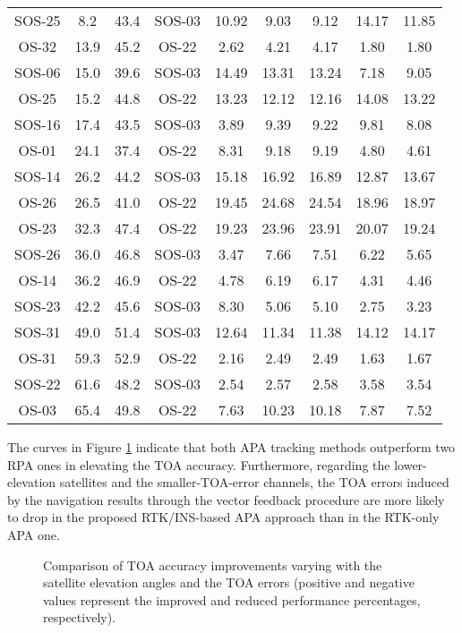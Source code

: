 \documentclass{article}
\newcommand{\reffig}[1]{Figure \ref{#1}}
\begin{document}
\begin{table}[htbp]
\begin{tabular}{ccccccccc}
	SOS-25 & 8.2 & 43.4 & SOS-03 & 10.92 & 9.03 & 9.12 & 14.17 & 11.85 \\  
	OS-32 & 13.9 & 45.2 & OS-22 & 2.62 & 4.21 & 4.17 & 1.80 & 1.80 \\  
	SOS-06 & 15.0 & 39.6 & SOS-03 & 14.49 & 13.31 & 13.24 & 7.18 & 9.05 \\  
	OS-25 & 15.2 & 44.8 & OS-22 & 13.23 & 12.12 & 12.16 & 14.08 & 13.22 \\  
	SOS-16 & 17.4 & 43.5 & SOS-03 & 3.89 & 9.39 & 9.22 & 9.81 & 8.08 \\  
	OS-01 & 24.1 & 37.4 & OS-22 & 8.31 & 9.18 & 9.19 & 4.80 & 4.61 \\  
	SOS-14 & 26.2 & 44.2 & SOS-03 & 15.18 & 16.92 & 16.89 & 12.87 & 13.67 \\  
	OS-26 & 26.5 & 41.0 & OS-22 & 19.45 & 24.68 & 24.54 & 18.96 & 18.97 \\  
	OS-23 & 32.3 & 47.4 & OS-22 & 19.23 & 23.96 & 23.91 & 20.07 & 19.24 \\  
	SOS-26 & 36.0 & 46.8 & SOS-03 & 3.47 & 7.66 & 7.51 & 6.22 & 5.65 \\  
	OS-14 & 36.2 & 46.9 & OS-22 & 4.78 & 6.19 & 6.17 & 4.31 & 4.46 \\  
	SOS-23 & 42.2 & 45.6 & SOS-03 & 8.30 & 5.06 & 5.10 & 2.75 & 3.23 \\  
	SOS-31 & 49.0 & 51.4 & SOS-03 & 12.64 & 11.34 & 11.38 & 14.12 & 14.17 \\  
	OS-31 & 59.3 & 52.9 & OS-22 & 2.16 & 2.49 & 2.49 & 1.63 & 1.67 \\  
	SOS-22 & 61.6 & 48.2 & SOS-03 & 2.54 & 2.57 & 2.58 & 3.58 & 3.54 \\  
	OS-03 & 65.4 & 49.8 & OS-22 & 7.63 & 10.23 & 10.18 & 7.87 & 7.52 \\  
	\bottomrule

	\end{tabular}
	\label{tab:tab2}

\end{table}


The curves in \reffig{fig:fig17} indicate that both APA tracking methods outperform two RPA ones in elevating the TOA accuracy. Furthermore, regarding the lower-elevation satellites and the smaller-TOA-error channels, the TOA errors induced by the navigation results through the vector feedback procedure are more likely to drop in the proposed RTK/INS-based APA approach than in the RTK-only APA one.

\begin{figure}[htbp]%
\centering
{}
\hfil
{}
\caption{Comparison of TOA accuracy improvements varying with the satellite elevation angles and the TOA errors (positive and negative values represent the improved and reduced performance percentages, respectively).}
\label{fig:fig17}
\end{figure}
\end{document}
